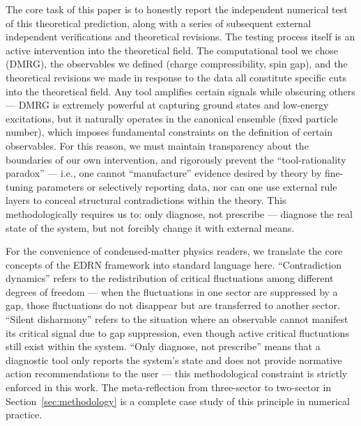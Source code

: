 \documentclass[prb,reprint,twocolumn,superscriptaddress]{revtex4-2}
\begin{document}
The core task of this paper is to honestly report the independent numerical test of this theoretical prediction, along with a series of subsequent external independent verifications and theoretical revisions. The testing process itself is an active intervention into the theoretical field. The computational tool we chose (DMRG), the observables we defined (charge compressibility, spin gap), and the theoretical revisions we made in response to the data all constitute specific cuts into the theoretical field. Any tool amplifies certain signals while obscuring others --- DMRG is extremely powerful at capturing ground states and low-energy excitations, but it naturally operates in the canonical ensemble (fixed particle number), which imposes fundamental constraints on the definition of certain observables. For this reason, we must maintain transparency about the boundaries of our own intervention, and rigorously prevent the ``tool-rationality paradox'' --- i.e., one cannot ``manufacture'' evidence desired by theory by fine-tuning parameters or selectively reporting data, nor can one use external rule layers to conceal structural contradictions within the theory. This methodologically requires us to: only diagnose, not prescribe --- diagnose the real state of the system, but not forcibly change it with external means.

For the convenience of condensed-matter physics readers, we translate the core concepts of the EDRN framework into standard language here. ``Contradiction dynamics'' refers to the redistribution of critical fluctuations among different degrees of freedom --- when the fluctuations in one sector are suppressed by a gap, those fluctuations do not disappear but are transferred to another sector. ``Silent disharmony'' refers to the situation where an observable cannot manifest its critical signal due to gap suppression, even though active critical fluctuations still exist within the system. ``Only diagnose, not prescribe'' means that a diagnostic tool only reports the system's state and does not provide normative action recommendations to the user --- this methodological constraint is strictly enforced in this work. The meta-reflection from three-sector to two-sector in Section~\ref{sec:methodology} is a complete case study of this principle in numerical practice.
\end{document}
